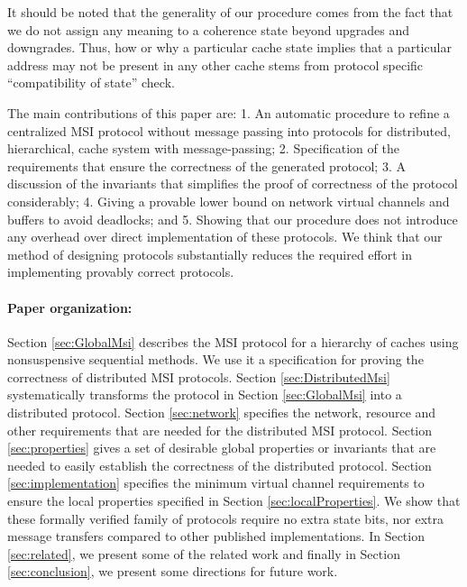 It should be noted that the generality of our procedure comes from the fact
that we do not assign any meaning to a coherence state beyond upgrades and
downgrades. Thus, how or why a particular cache state implies that a particular
address may not be present in any other cache stems from protocol specific
``compatibility of state'' check. 

The main contributions of this paper are: 1. An automatic procedure to refine a
centralized MSI protocol without message passing into protocols for
distributed, hierarchical, cache system with message-passing; 2. Specification
of the requirements that ensure the correctness of the generated protocol;
3. A discussion of the invariants that simplifies the proof of correctness of
the protocol considerably;
4. Giving a provable lower bound on network virtual channels and buffers to
avoid deadlocks; and 5. Showing that our procedure does not introduce any
overhead over direct implementation of these protocols. We think that our
method of designing protocols substantially reduces the required effort in
implementing provably correct protocols. 

\paragraph{Paper organization:} Section \ref{sec:GlobalMsi} describes the MSI
protocol for a hierarchy of caches using nonsuspensive sequential methods. We
use it a specification for proving the correctness of distributed MSI
protocols. Section \ref{sec:DistributedMsi} systematically transforms the
protocol in Section \ref{sec:GlobalMsi} into a distributed protocol. Section
\ref{sec:network} specifies the network, resource and other requirements that
are needed for the distributed MSI protocol. Section \ref{sec:properties} gives
a set of desirable global properties or invariants that are needed to easily
establish the correctness of the distributed protocol.
Section \ref{sec:implementation} specifies the minimum virtual
channel requirements to ensure the local properties specified in Section
\ref{sec:localProperties}. We show that these formally verified family of
protocols require no extra state bits, nor extra message transfers compared to
other published implementations.  In Section \ref{sec:related}, we present some
of the related work and finally in Section \ref{sec:conclusion}, we present
some directions for future work.
